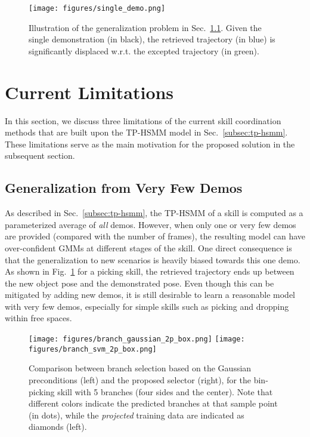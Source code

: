 \begin{figure}[t!]
    \centering
    \texttt{[image: figures/single\_demo.png]}
    \caption{Illustration of the generalization problem in Sec.~\ref{subsec:limit-few}. 
Given the single demonstration (in black), the retrieved trajectory (in blue) is significantly displaced w.r.t. the excepted trajectory (in green).}
    \label{fig:single_demo}
    \vspace{-0.15cm}
\end{figure}
\section{Current Limitations}\label{sec:limitation}
In this section, we discuss three limitations of the current skill coordination methods that are built upon the TP-HSMM model in Sec.~\ref{subsec:tp-hsmm}. 
These limitations serve as the main motivation for the proposed solution in the subsequent section. 


\subsection{Generalization from Very Few Demos}\label{subsec:limit-few}
As described in Sec.~\ref{subsec:tp-hsmm}, the TP-HSMM of a skill is computed as a parameterized average of \emph{all} demos. 
However, when only one or very few demos are provided (compared with the number of frames), 
the resulting model can have over-confident GMMs at different stages of the skill. 
One direct consequence is that the generalization to new scenarios is heavily biased towards this one demo.
As shown in Fig.~\ref{fig:single_demo} for a picking skill, the retrieved trajectory ends up between the new object pose and the demonstrated pose.
Even though this can be mitigated by adding new demos, 
it is still desirable to learn a reasonable model with very few demos,
especially for simple skills such as picking and dropping within free spaces.

\begin{figure}[t!]
    \centering
    \texttt{[image: figures/branch\_gaussian\_2p\_box.png]}
    \texttt{[image: figures/branch\_svm\_2p\_box.png]}
    \caption{
Comparison between branch selection based on the Gaussian preconditions (left) 
and the proposed selector (right), 
    for the bin-picking skill with 5 branches (four sides and the center). 
    Note that different colors indicate the predicted branches at that sample point (in dots),
 while the \emph{projected} training data are indicated as diamonds (left).}
    \label{fig:branch_compare}
    \vspace{-0.15cm}
\end{figure}

